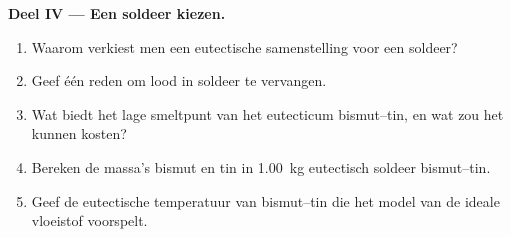 \begin{problem}
\medskip
\noindent\textbf{Deel IV --- Een soldeer kiezen.}
\begin{enumerate}[resume]
  \item Waarom verkiest men een eutectische samenstelling voor een soldeer?
  \item Geef één reden om lood in soldeer te vervangen.
  \item Wat biedt het lage smeltpunt van het eutecticum bismut--tin, en
        wat zou het kunnen kosten?
  \item Bereken de massa's bismut en tin in \qty{1.00}{kg} eutectisch
        soldeer bismut--tin.
  \item Geef de eutectische temperatuur van bismut--tin die het model van de
        ideale vloeistof voorspelt.
\end{enumerate}
\end{problem}
